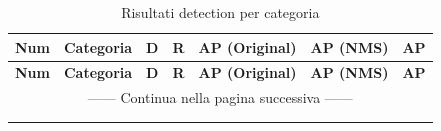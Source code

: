 \begin{center}
\begin{longtable}{|c|l|c|c|c|c|c|}

\hline \multicolumn{1}{|c|}{\textbf{Num}} &
\multicolumn{1}{c|}{\textbf{Categoria}} & \multicolumn{1}{c|}{\textbf{D}} & \multicolumn{1}{c|}{\textbf{R}} & \multicolumn{1}{c|}{\textbf{AP (Original)}} &\multicolumn{1}{c|}{\textbf{AP (NMS)}} &\multicolumn{1}{c|}{\textbf{AP}} \\ \hline\endfirsthead

\hline \multicolumn{1}{|c|}{\textbf{Num}} &
\multicolumn{1}{c|}{\textbf{Categoria}} & \multicolumn{1}{c|}{\textbf{D}} & \multicolumn{1}{c|}{\textbf{R}} &\multicolumn{1}{c|}{\textbf{AP (Original)}} &\multicolumn{1}{c|}{\textbf{AP (NMS)}} &\multicolumn{1}{c|}{\textbf{AP}}\\ \hline \endhead

\hline \multicolumn{7}{|c|}{{------ Continua nella pagina successiva ------}} \\ \hline
\endfoot

\hline

\caption{Risultati detection per categoria}
\label{risultati detection per categoria} \\

\endlastfoot



\end{longtable}
\end{center}
